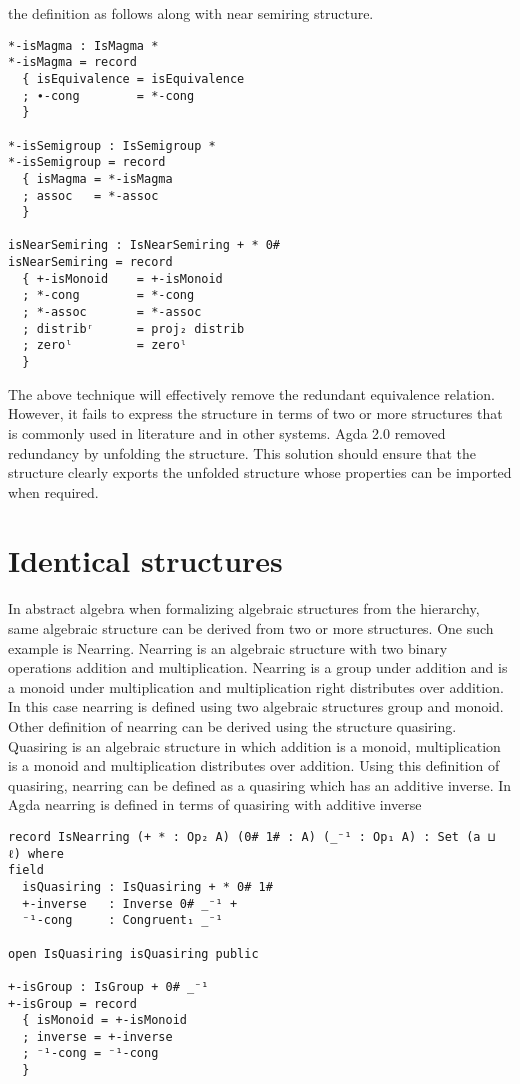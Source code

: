 the definition as follows along with near semiring structure.
\begin{verbatim}
*-isMagma : IsMagma *
*-isMagma = record
  { isEquivalence = isEquivalence
  ; ∙-cong        = *-cong
  }

*-isSemigroup : IsSemigroup *
*-isSemigroup = record
  { isMagma = *-isMagma
  ; assoc   = *-assoc
  }

isNearSemiring : IsNearSemiring + * 0#
isNearSemiring = record
  { +-isMonoid    = +-isMonoid
  ; *-cong        = *-cong
  ; *-assoc       = *-assoc
  ; distribʳ      = proj₂ distrib
  ; zeroˡ         = zeroˡ
  }
\end{verbatim}
The above technique will effectively remove the redundant equivalence relation.
However, it fails to express the structure in terms of two or more structures
that is commonly used in literature and in other systems. Agda 2.0 removed
redundancy by unfolding the structure. This solution should ensure that the
structure clearly exports the unfolded structure whose properties can be
imported when required.

\section{Identical structures}
In abstract algebra when formalizing algebraic structures from the hierarchy,
same algebraic structure can be derived from two or more structures. One such
example is Nearring. Nearring is an algebraic structure with two binary
operations addition and multiplication. Nearring is a group under addition and
is a monoid under multiplication and multiplication right distributes over
addition. In this case nearring is defined using two algebraic structures group
and monoid. Other definition of nearring can be derived using the structure
quasiring. Quasiring is an algebraic structure in which addition is a monoid,
multiplication is a monoid and multiplication distributes over addition. Using
this definition of quasiring, nearring can be defined as a quasiring which has
an additive inverse. In Agda nearring is defined in terms of quasiring with
additive inverse 

\begin{verbatim}
record IsNearring (+ * : Op₂ A) (0# 1# : A) (_⁻¹ : Op₁ A) : Set (a ⊔ ℓ) where
field
  isQuasiring : IsQuasiring + * 0# 1#
  +-inverse   : Inverse 0# _⁻¹ +
  ⁻¹-cong     : Congruent₁ _⁻¹

open IsQuasiring isQuasiring public

+-isGroup : IsGroup + 0# _⁻¹
+-isGroup = record 
  { isMonoid = +-isMonoid 
  ; inverse = +-inverse 
  ; ⁻¹-cong = ⁻¹-cong 
  }
\end{verbatim}

